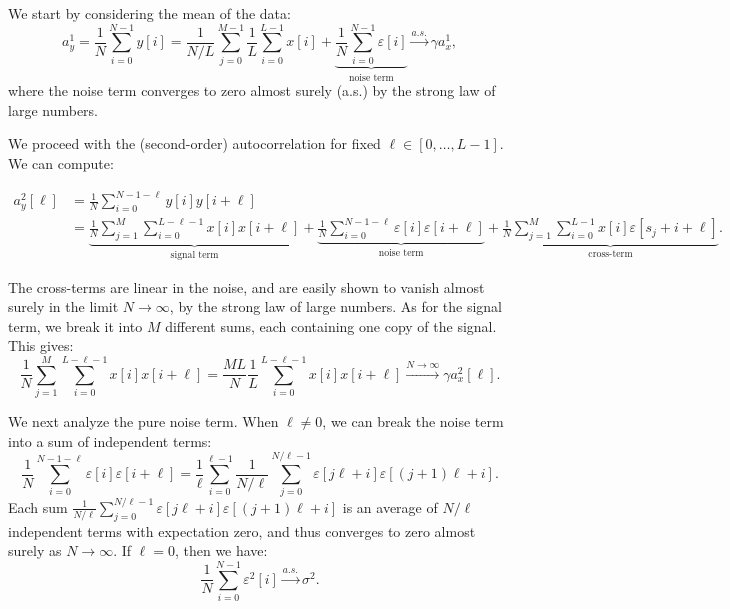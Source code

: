 \documentclass[english,11pt]{article}
\newcommand{\1}{\mathbf{1}}
\numberwithin{equation}{section}
\theoremstyle{plain}
\theoremstyle{definition}
\theoremstyle{remark}
\theoremstyle{plain}
\theoremstyle{remark}
\theoremstyle{plain}
\theoremstyle{plain}
\begin{document}
We start by considering the mean of the data:
%
\begin{equation}
a_y^1 = \frac{1}{N}\sum_{i=0}^{N-1} y[i] =
\frac{1}{N/L}\sum_{j=0}^{M-1}\frac{1}{L}\sum_{i=0}^{L-1}x[i] +    
\underbrace{\frac{1}{N}\sum_{i=0}^{N-1}\varepsilon[i]}_{\text{noise term}}
\xrightarrow{a.s.}\gamma a_x^1,
\end{equation}
%
where the noise term converges to zero almost surely (a.s.) by the strong law of large numbers.

We proceed with the (second-order) autocorrelation for fixed $\ell\in[0,\ldots,L-1]$. We can compute:
%

\begin{align}
%
a_y^2[\ell] & = \frac{1}{N}\sum_{i=0}^{N-1-\ell}y[i]y[i+\ell]
\nonumber \\
& = \underbrace{\frac{1}{N}\sum_{j=1}^{M}\sum_{i=0}^{L-\ell-1}x[i]x[i+\ell]}_{\text{signal term}} + \underbrace{\frac{1}{N}\sum_{i=0}^{N-1-\ell}\varepsilon[i]\varepsilon[i+\ell]}_{\text{noise term}}
+ \underbrace{\frac{1}{N} \sum_{j=1}^{M} \sum_{i=0}^{L-1} x[i] \varepsilon[s_j + i + \ell]}_{\text{cross-term}}.
%
\end{align}

The cross-terms are linear in the noise, and are easily shown to vanish almost surely in the limit $N\to\infty$, by the strong law of large numbers. As for the signal term, we break it into $M$ different sums, each containing one copy of the signal. This gives:
%
\begin{equation} \label{eq:2nd_moment_signal_term}
%
\frac{1}{N}\sum_{j=1}^{M}\sum_{i=0}^{L-\ell-1}x[i]x[i+\ell] = \frac{ML}{N}\frac{1}{L}\sum_{i=0}^{L-\ell-1}x[i]x[i+\ell]\xrightarrow{N\to\infty}\gamma a_x^2[\ell].
%
\end{equation}
%

We next analyze the pure noise term. When $\ell\neq 0$, we can break the noise term into a sum of independent terms:
%
\begin{equation}
%
\frac{1}{N}\sum_{i=0}^{N-1-\ell} \varepsilon[i]\varepsilon[i+\ell] = \frac{1}{\ell}\sum_{i=0}^{\ell-1}\frac{1}{N/\ell}\sum_{j=0}^{N/\ell -1} \varepsilon[j\ell + i] \varepsilon[(j+1)\ell + i].
%
\end{equation}
%
Each sum $\frac{1}{N/\ell}\sum_{j=0}^{N/\ell -1} \varepsilon[j\ell + i] \varepsilon[(j+1)\ell + i]$ is an average of $N/\ell$ independent terms with expectation zero, and thus converges to zero almost surely as $N\to\infty$. If $\ell=0$, then we have:
%
\begin{equation}
%
\frac{1}{N}\sum_{i=0}^{N-1} \varepsilon^2[i] \xrightarrow{a.s.} \sigma^2.
%
\end{equation}
\end{document}
